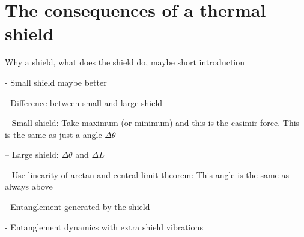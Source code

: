 \chapter{The consequences of a thermal shield}\label{cha:the-shield}

Why a shield, what does the shield do, maybe short introduction


- Small shield maybe better

- Difference between small and large shield
  
  -- Small shield: Take maximum (or minimum) and this is the casimir force. This is the same as just a angle $\Delta \theta$
  
  -- Large shield: $\Delta \theta$ and $\Delta L$

  -- Use linearity of arctan and central-limit-theorem: This angle is the same as always above

- Entanglement generated by the shield

- Entanglement dynamics with extra shield vibrations










